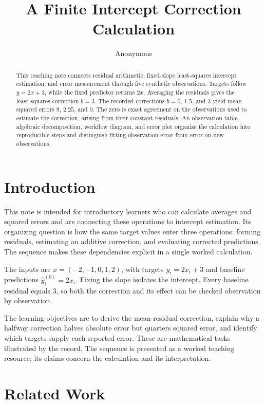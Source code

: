 \documentclass[11pt]{article}
\title{A Finite Intercept Correction Calculation}
\author{Anonymous}
\date{}
\begin{document}
\maketitle

\begin{abstract}
This teaching note connects residual arithmetic, fixed-slope least-squares intercept estimation, and error measurement through five synthetic observations. Targets follow $y=2x+3$, while the fixed predictor returns $2x$. Averaging the residuals gives the least-squares correction $b=3$. The recorded corrections $b=0$, $1.5$, and $3$ yield mean squared errors $9$, $2.25$, and $0$. The zero is exact agreement on the observations used to estimate the correction, arising from their constant residuals. An observation table, algebraic decomposition, workflow diagram, and error plot organize the calculation into reproducible steps and distinguish fitting-observation error from error on new observations.
\end{abstract}

\section{Introduction}

This note is intended for introductory learners who can calculate averages and squared errors and are connecting these operations to intercept estimation. Its organizing question is how the same target values enter three operations: forming residuals, estimating an additive correction, and evaluating corrected predictions. The sequence makes these dependencies explicit in a single worked calculation.

The inputs are $x=(-2,-1,0,1,2)$, with targets $y_i=2x_i+3$ and baseline predictions $\hat y_i^{(0)}=2x_i$. Fixing the slope isolates the intercept. Every baseline residual equals $3$, so both the correction and its effect can be checked observation by observation.

The learning objectives are to derive the mean-residual correction, explain why a halfway correction halves absolute error but quarters squared error, and identify which targets supply each reported error. These are mathematical tasks illustrated by the record. The sequence is presented as a worked teaching resource; its claims concern the calculation and its interpretation.

\section{Related Work}
\end{document}
